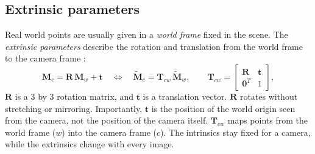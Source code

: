 \subsection{Extrinsic parameters}
\label{subsec:ch3.extrinsics}
Real world points are usually given in a \textit{world frame} fixed in the scene.
The \textit{extrinsic parameters} describe the rotation and translation
 from the world frame to the camera frame \cite{hartleyMultipleViewGeometry2004}:
\begin{equation}
	\mathbf{M}_c = \mathbf{R}\,\mathbf{M}_w + \mathbf{t}
	\quad\Longleftrightarrow\quad
	\tilde{\mathbf{M}}_c = \mathbf{T}_{cw}\,\tilde{\mathbf{M}}_w,
	\qquad
	\mathbf{T}_{cw} =
	\begin{bmatrix}
		\mathbf{R} & \mathbf{t} \\
		\mathbf{0}^T & 1
	\end{bmatrix},
	\label{eq:ch3.extrinsic}
\end{equation}
$\mathbf{R}$ is a 3 by 3 rotation matrix, and $\mathbf{t}$ is a translation vector.
  $\mathbf{R}$ rotates without stretching or mirroring.
  Importantly, $\mathbf{t}$ is the position of the world origin seen from the camera, not the position of the camera itself.
  $\mathbf{T}_{cw}$ maps points from the world frame ($w$) into the camera frame ($c$).
The intrinsics stay fixed for a camera, while the extrinsics change with every image.


